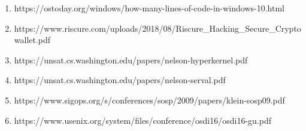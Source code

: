 \documentclass[]{article}
\providecommand{\tightlist}{%
  \setlength{\itemsep}{0pt}\setlength{\parskip}{0pt}}
\begin{document}
\begin{enumerate}
\def\labelenumi{\arabic{enumi}.}
\tightlist
\item
  https://ostoday.org/windows/how-many-lines-of-code-in-windows-10.html
\item
  https://www.riscure.com/uploads/2018/08/Riscure\_Hacking\_Secure\_Cryptowallet.pdf
\item
  https://unsat.cs.washington.edu/papers/nelson-hyperkernel.pdf
\item
  https://unsat.cs.washington.edu/papers/nelson-serval.pdf
\item
  https://www.sigops.org/s/conferences/sosp/2009/papers/klein-sosp09.pdf
\item
  https://www.usenix.org/system/files/conference/osdi16/osdi16-gu.pdf
\end{enumerate}
\end{document}
